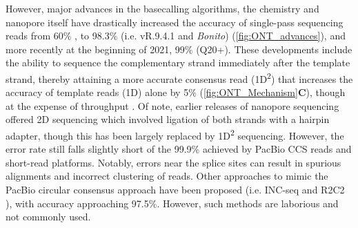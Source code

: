 However, major advances in the basecalling algorithms, the chemistry and nanopore itself have drastically increased the accuracy of single-pass sequencing reads from 60\% \cite{Jain2015}, to 98.3\% (i.e. vR.9.4.1 and \textit{Bonito}) (\cref{fig:ONT_advances}), and more recently at the beginning of 2021, 99\% (Q20+)\cite{OxfordNanoporeTechnologiesplc.2021}. These developments include the ability to sequence the complementary strand immediately after the template strand, thereby attaining a more accurate consensus read (1D\textsuperscript{2}) that increases the accuracy of template reads (1D) alone by 5\%\cite{Rang2018} (\cref{fig:ONT_Mechanism}\textbf{C}), though at the expense of throughput \cite{NanoporeCommunityPosts}. Of note, earlier releases of nanopore sequencing offered 2D sequencing which involved ligation of both strands with a hairpin adapter, though this has been largely replaced by 1D\textsuperscript{2} sequencing. However, the error rate still falls slightly short of the 99.9\% achieved by PacBio CCS reads and short-read platforms. Notably, errors near the splice sites can result in spurious alignments and incorrect clustering of reads. Other approaches to mimic the PacBio circular consensus approach have been proposed (i.e. INC-seq \cite{Li2016c} and R2C2 \cite{Volden2018}), with accuracy approaching 97.5\%. However, such methods are laborious and not commonly used.  

